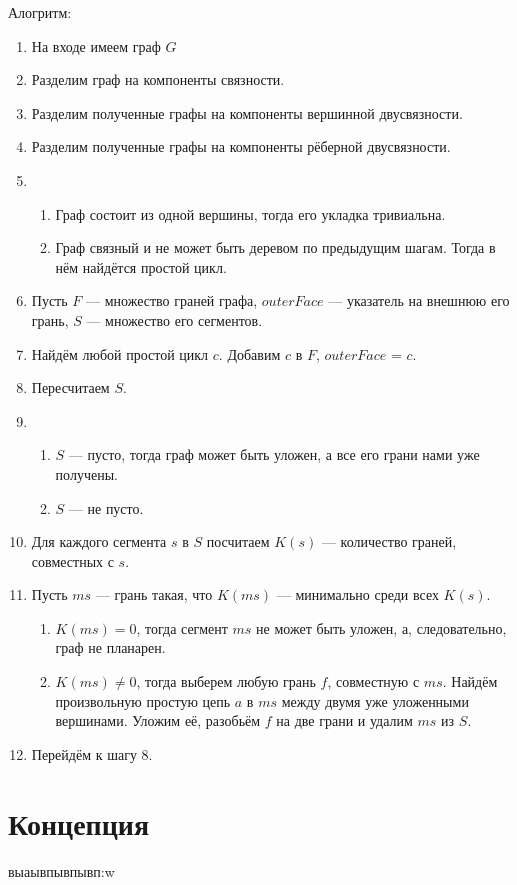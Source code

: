\documentclass[a4paper, 10pt]{article}
\begin{document}
Алогритм:
\begin{enumerate}
    \item На входе имеем граф $G$
    \item Разделим граф на компоненты связности.
    \item Разделим полученные графы на компоненты вершинной двусвязности.
    \item Разделим полученные графы на компоненты рёберной двусвязности. 
    \item 
          \begin{enumerate}
          \item Граф состоит из одной вершины, тогда его укладка тривиальна.
          \item Граф связный и не может быть деревом по предыдущим шагам.
                Тогда в нём найдётся простой цикл.
          \end{enumerate}
    \item Пусть $F$ — множество граней графа, $outerFace$ — указатель на внешнюю его грань, $S$ — множество его сегментов.
    \item Найдём любой простой цикл $c$. Добавим $c$ в $F$, $outerFace$ = $c$.
    \item Пересчитаем $S$.
    \item
          \begin{enumerate}
          \item $S$ — пусто, тогда граф может быть уложен, а все его грани нами уже получены.
          \item $S$ — не пусто.
          \end{enumerate}
    \item Для каждого сегмента $s$ в $S$ посчитаем $K(s)$ — количество граней, совместных с $s$.
    \item Пусть $ms$ — грань такая, что $K(ms)$ — минимально среди всех $K(s)$.
          \begin{enumerate}
          \item $K(ms) = 0$, тогда сегмент $ms$ не может быть уложен, а, следовательно, граф не планарен.
          \item $K(ms) \ne 0$, тогда выберем любую грань $f$, совместную с $ms$. Найдём произвольную простую цепь $a$ в $ms$ между двумя уже уложенными вершинами. Уложим её, разобьём $f$ на две грани и удалим $ms$ из $S$.
          \end{enumerate}
    \item Перейдём к шагу 8.
        
    
\end{enumerate}

\section{Концепция}
выаывпывпывп:w
\end{document}
